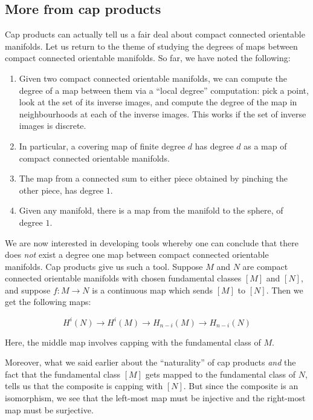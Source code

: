 \documentclass[a4paper]{amsart}
\begin{document}
\subsection{More from cap products}

Cap products can actually tell us a fair deal about compact connected
orientable manifolds. Let us return to the theme of studying the
degrees of maps between compact connected orientable manifolds. So
far, we have noted the following:

\begin{enumerate}

\item Given two compact connected orientable manifolds, we can compute
  the degree of a map between them via a ``local degree'' computation:
  pick a point, look at the set of its inverse images, and compute the
  degree of the map in neighbourhoods at each of the inverse
  images. This works if the set of inverse images is discrete.

\item In particular, a covering map of finite degree $d$ has degree $d$ as a
  map of compact connected orientable manifolds.

\item The map from a connected sum to either piece obtained by
  pinching the other piece, has degree $1$.

\item Given any manifold, there is a map from the manifold to the
  sphere, of degree $1$.

\end{enumerate}

We are now interested in developing tools whereby one can conclude
that there does {\em not} exist a degree one map between compact
connected orientable manifolds. Cap products give us such a tool.
Suppose $M$ and $N$ are compact connected orientable manifolds with
chosen fundamental classes $[M]$ and $[N]$, and suppose $f:M \to N$ is
a continuous map which sends $[M]$ to $[N]$. Then we get the following
maps:

$$H^i(N) \to H^i(M) \to H_{n-i}(M) \to H_{n-i}(N)$$

Here, the middle map involves capping with the fundamental class of $M$.

Moreover, what we said earlier about the ``naturality'' of cap
products {\em and} the fact that the fundamental class $[M]$ gets
mapped to the fundamental class of $N$, tells us that the composite is
capping with $[N]$. But since the composite is an isomorphism, we see
that the left-most map must be injective and the right-most map must be
surjective. 
\end{document}
